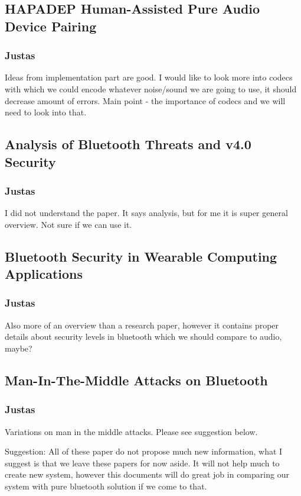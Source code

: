 \documentclass[12pt]{article}
\begin{document}
\subsection{HAPADEP Human-Assisted Pure Audio Device Pairing}
\label{sub:HAPADEP Human-Assisted Pure Audio Device Pairing}

\subsubsection{Justas}
\label{subs:Justas}

Ideas from implementation part are good. I would like to look more into codecs with which we could encode whatever noise/sound we are going to use, it should decrease amount of errors. Main point - the importance of codecs and we will need to look into that.

\subsection{Analysis of Bluetooth Threats and v4.0 Security}
\label{sub:Analysis of Bluetooth Threats and v4.0 Security}

\subsubsection{Justas}
\label{subs:Justas}

I did not understand the paper. It says analysis, but for me it is super general overview. Not sure if we can use it.

\subsection{Bluetooth Security in Wearable Computing Applications}
\label{sub:Bluetooth Security in Wearable Computing Applications}

\subsubsection{Justas}
\label{subs:Justas}

Also more of an overview than a research paper, however it contains proper details about security levels in bluetooth which we should compare to audio, maybe?

\subsection{Man-In-The-Middle Attacks on Bluetooth}
\label{sub:Man-In-The-Middle Attacks on Bluetooth}

\subsubsection{Justas}
\label{subs:Justas}

Variations on man in the middle attacks. Please see suggestion below.

Suggestion:
All of these paper do not propose much new information, what I suggest is that we leave these papers for now aside. It will not help much to create new system, however this documents will do great job in comparing our system with pure bluetooth solution if we come to that.
\end{document}
